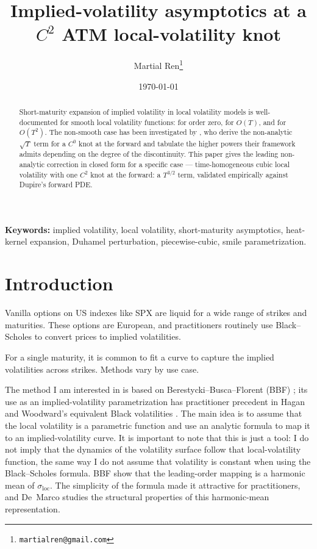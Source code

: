 \documentclass[11pt]{article}
\title{Implied-volatility asymptotics at a\\
$C^{2}$ ATM local-volatility knot}
\author{Martial Ren\thanks{\texttt{martialren@gmail.com}}}
\date{\today}
\begin{document}
\maketitle

\begin{abstract}
Short-maturity expansion of implied volatility in local volatility
models is well-documented for smooth local volatility functions:
\citet{berestycki2002} for order zero, \citet{henrylabordere2008}
for $O(T)$, and \citet{gatheral2012} for $O(T^{2})$. The non-smooth
case has been investigated by \citet{costeanuPirjol2011}, who derive
the non-analytic $\sqrt{T}$ term for a $C^{0}$ knot at the forward
and tabulate the higher powers their framework admits 
depending on the degree of the discontinuity. 
This paper gives the leading non-analytic correction in closed form
for a specific case --- time-homogeneous cubic local volatility with
one $C^{2}$ knot at the forward: a $T^{3/2}$ term, validated
empirically against Dupire's forward PDE.
\end{abstract}

\noindent\textbf{Keywords:} implied volatility, local volatility,
short-maturity asymptotics, heat-kernel expansion, Duhamel
perturbation, piecewise-cubic, smile parametrization.

\section{Introduction}

Vanilla options on US indexes like SPX are liquid for a wide range
of strikes and maturities. These options are European, and
practitioners routinely use Black--Scholes to convert prices to
implied volatilities.

For a single maturity, it is common to fit a curve to capture the
implied volatilities across strikes. Methods vary by use case.

The method I am interested in is based on Berestycki--Busca--Florent
(BBF) \citep{berestycki2002}; its use as an implied-volatility
parametrization has practitioner precedent in Hagan and Woodward's
equivalent Black volatilities \citep{haganWoodward1999}. The main
idea is to assume that the local volatility is a parametric function
and use an analytic formula to map it to an implied-volatility curve.
It is important to note that this is just a tool: I do not imply
that the dynamics of the volatility surface follow that
local-volatility function, the same way I do not assume that
volatility is constant when using the Black--Scholes formula. BBF
show that the leading-order mapping is a harmonic mean of
$\sigma_{\mathrm{loc}}$. The simplicity of the formula made it
attractive for practitioners, and De~Marco \citep{demarco2021}
studies the structural properties of this harmonic-mean
representation.
\end{document}

